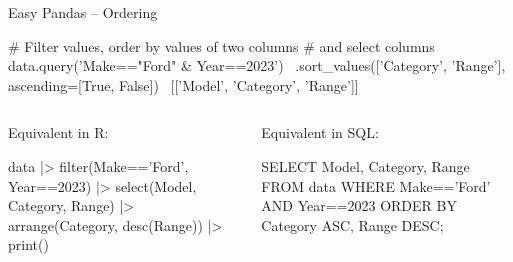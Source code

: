 \documentclass[ignorenonframetext,xcolor=x11names]{beamer}
\begin{document}
\begin{frame}[fragile]{Easy Pandas -- Ordering}
\begin{pythoncode}
# Filter values, order by values of two columns
# and select columns
data.query('Make=="Ford" & Year==2023') \
  .sort_values(['Category', 'Range'], ascending=[True, False]) \
  [['Model', 'Category', 'Range']]
\end{pythoncode}

\vspace{\baselineskip}
\begin{columns}
\begin{column}{.5\textwidth}
Equivalent in R:
\begin{Rcode}
data |> 
  filter(Make=='Ford', 
         Year==2023) |> 
  select(Model, Category, 
         Range) |>
  arrange(Category, 
          desc(Range)) |>
  print()
\end{Rcode}

\end{column}
\begin{column}{.5\textwidth}
Equivalent in SQL:

\begin{sqlcode}
SELECT Model, Category, Range
   FROM data 
   WHERE Make=='Ford' AND 
         Year==2023
   ORDER BY Category ASC, 
            Range DESC;
\end{sqlcode}
\end{column}
\end{columns}
\end{frame}
\end{document}

